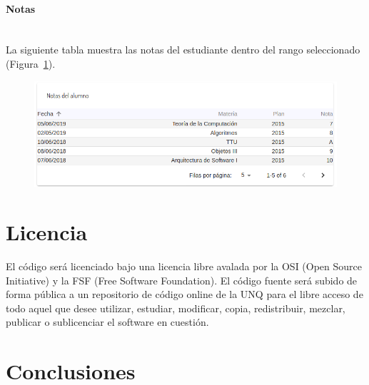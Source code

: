 \paragraph{Notas} \mbox{}\\
La siguiente tabla muestra las notas del estudiante dentro del rango seleccionado (Figura~\ref{fig:sa-notas}).

\begin{figure}[H]
  \centering
    \includegraphics[scale=0.4]{images/seguimiento-academico/sa-notas.png}
  \label{fig:sa-notas}
\end{figure}



\section{Licencia}
El código será licenciado bajo una licencia libre avalada por la OSI (Open Source Initiative) y la
FSF (Free Software Foundation). El código fuente será subido de forma pública a un repositorio
de código online de la UNQ para el libre acceso de todo aquel que desee utilizar, estudiar,
modificar, copia, redistribuir, mezclar, publicar o sublicenciar el software en cuestión.

\section[Conclusiones]{Conclusiones}
